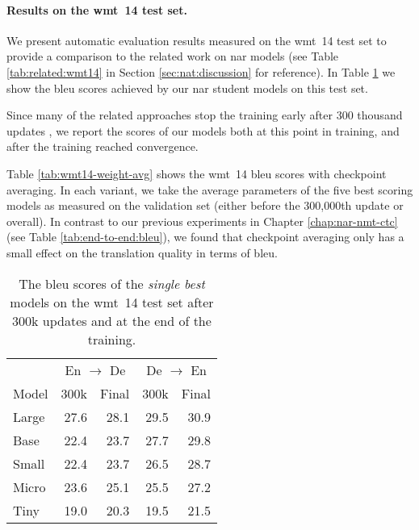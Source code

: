 \paragraph{Results on the \acs{wmt}~14 test set.}
We present automatic evaluation results measured on the \acs{wmt}~14 test set
to provide a comparison to the related work on \acl{nar} models (see Table
\ref{tab:related:wmt14} in Section \ref{sec:nat:discussion} for reference).  In
Table \ref{tab:wmt14-bleu-scores} we show the \acs{bleu} scores achieved by our
\ac{nar} student models on this test set.

Since many of the related approaches stop the training early after 300 thousand
updates \citep{gu2017nonautoregressive, gu-kong-2021-fully}, we report the
scores of our models both at this point in training, and after the training
reached convergence.

Table \ref{tab:wmt14-weight-avg} shows the \acs{wmt}~14 \acs{bleu} scores with
checkpoint averaging. In each variant, we take the average parameters of the
five best scoring models as measured on the validation set (either before the
300,000th update or overall). In contrast to our previous experiments in
Chapter \ref{chap:nar-nmt-ctc} (see Table \ref{tab:end-to-end:bleu}), we found
that checkpoint averaging only has a small effect on the translation quality in
terms of \acs{bleu}.

\begin{table}
  \centering
  \begin{tabular}{lrrrr}
    \toprule
    & \multicolumn{2}{c}{En $\rightarrow$ De}
    & \multicolumn{2}{c}{De $\rightarrow$ En} \\
    Model
    & 300k & Final & 300k &  Final \\
    \midrule

    Large & 27.6 & 28.1 & 29.5 & 30.9 \\
    Base  & 22.4 & 23.7 & 27.7 & 29.8 \\
    Small & 22.4 & 23.7 & 26.5 & 28.7 \\
    Micro & 23.6 & 25.1 & 25.5 & 27.2 \\
    Tiny  & 19.0 & 20.3 & 19.5 & 21.5 \\

    \bottomrule
  \end{tabular}

  \caption{The \acs{bleu} scores of the \emph{single best} models on the
    \acs{wmt}~14 test set after 300k updates and at the end of the training.}%
  \label{tab:wmt14-bleu-scores}
\end{table}

